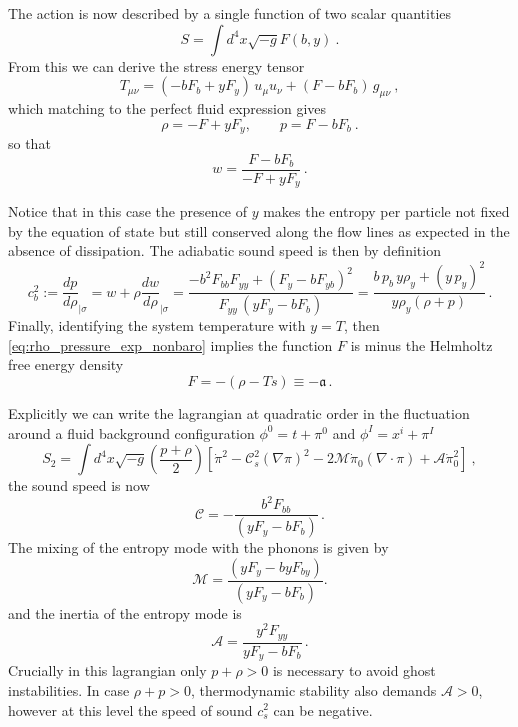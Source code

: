 The action is now described by a single function of two scalar quantities
\begin{equation}
S=\int d^4 x\sqrt{-g} F(b,y)\ .
\end{equation}
From this we can derive the stress energy tensor
\begin{equation}
T_{\mu\nu}=(-b F_b+y F_y )\,u_\mu u_\nu
           + (F - b F_b)\,g_{\mu\nu}\ ,
\end{equation}
which matching to the perfect fluid expression gives
\begin{equation}\label{eq:rho_pressure_exp_nonbaro}
\rho = - F+yF_y , \qquad p = F- b F_b \ .
\end{equation}
so that 
\begin{equation}
w=\frac{ F- b F_b}{- F+yF_y}\,. 
\end{equation}

Notice that in this case the presence of $y$ makes the entropy per particle not fixed by the equation of state but still conserved along the flow lines as expected in the absence of dissipation. 
The adiabatic sound speed is then by definition
\begin{equation}
c_b^2:=\frac{dp}{d\rho}_{\mid\sigma}=w+\rho\frac{dw}{d\rho}_{\mid\sigma}=\frac{-b^2F_{bb} F_{yy}+(F_y-bF_{yb})^2}{F_{yy}\,(yF_y-bF_b)} = \frac{b\,p_b \,y\rho_y + (y\,p_y)^2}{y \rho_y (\rho+p)}\,.
\end{equation}
Finally, identifying the system temperature with $y=T$, then \eqref{eq:rho_pressure_exp_nonbaro} implies the function $F$ is minus the Helmholtz free energy density 
\begin{equation}
    F=-(\rho-Ts)\equiv-\mathfrak{a}\,.
\end{equation}

Explicitly we can write the lagrangian at quadratic order in the fluctuation around a fluid background configuration $\phi^0=t+\pi^0$ and $\phi^I=x^i+\pi^I$
\begin{equation}
S_2=\int d^4x\sqrt{-g}\left(\frac{p+\rho}{2}\right)\left[\dot\pi^2-\mathcal{C}_s^2(\nabla\pi)^2-2\mathcal{M}\dot{\pi}_0 (\nabla\!\!\cdot\!\pi)+\mathcal{A} \dot{\pi}_0^2\right]\ , 
\end{equation}
the sound speed is now 
\begin{equation}
\mathcal{C} = -\frac{b^2F_{bb}}{(yF_y-bF_b)}\,.
\end{equation}
The mixing of the entropy mode with the phonons is given by 
\begin{equation}
\mathcal{M} = \frac{(yF_y-byF_{by})}{(yF_y-bF_b)}.
\end{equation}
and the inertia of the entropy mode is
\begin{equation}
\mathcal{A}= \frac{y^2 F_{yy}}{y F_y-b F_b}\,.
\end{equation}
Crucially in this lagrangian only $p+\rho>0$ is necessary to avoid ghost instabilities.
In case $\rho+p>0$, thermodynamic stability also demands $\mathcal{A}>0$, however at this level the speed of sound $c_s^2$ can be negative.


